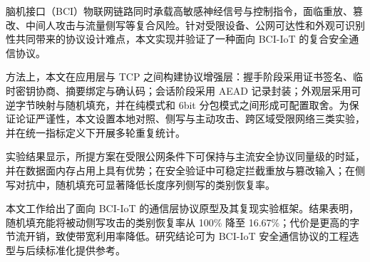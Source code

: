 \begin{chineseabstract}
脑机接口（BCI）物联网链路同时承载高敏感神经信号与控制指令，面临重放、篡改、中间人攻击与流量侧写等复合风险。针对受限设备、公网可达性和外观可识别性共同带来的协议设计难点，本文实现并验证了一种面向 BCI-IoT 的复合安全通信协议。

方法上，本文在应用层与 TCP 之间构建协议增强层：握手阶段采用证书签名、临时密钥协商、摘要绑定与确认码；会话阶段采用 AEAD 记录封装；外观层采用可逆字节映射与随机填充，并在纯模式和 6bit 分包模式之间形成可配置取舍。为保证论证严谨性，本文设置本地对照、侧写与主动攻击、跨区域受限网络三类实验，并在统一指标定义下开展多轮重复统计。

实验结果显示，所提方案在受限公网条件下可保持与主流安全协议同量级的时延，并在数据面内存占用上具有优势；在安全验证中可稳定拦截重放与篡改输入；在侧写对抗中，随机填充可显著降低长度序列侧写的类别恢复率。

本文工作给出了面向 BCI-IoT 的通信层协议原型及其复现实验框架。结果表明，随机填充能将被动侧写攻击的类别恢复率从 100\% 降至 16.67\%；代价是更高的字节流开销，致使带宽利用率降低。研究结论可为 BCI-IoT 安全通信协议的工程选型与后续标准化提供参考。

\end{chineseabstract}
